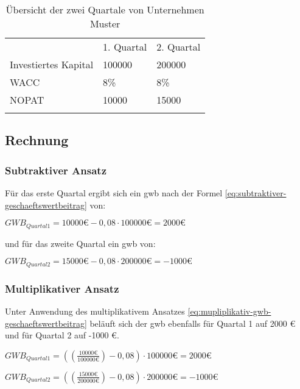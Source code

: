 \bigskip
\begin{table}[!h]
    \begin{tabular}{lll}
        \cline{1-3} \rowcolor{gray}
                             & 1. Quartal & 2. Quartal \\ \cline{1-3} \rowcolor{white}
        Investiertes Kapital & 100000     & 200000     \\ \cline{1-3} \rowcolor{white}
        WACC                 & 8\%        & 8\%        \\ \cline{1-3} \rowcolor{white}
        NOPAT                & 10000      & 15000      \\ \cline{1-3} \rowcolor{white}
    \end{tabular}
    \caption{Übersicht der zwei Quartale von Unternehmen Muster}
    \label{tb:evaQuartale}
\end{table}

\subsection{Rechnung}

\subsubsection{Subtraktiver Ansatz}

Für das erste Quartal ergibt sich ein \ac{gwb} nach der Formel \eqref{eq:subtraktiver-geschaeftswertbeitrag} von:

\bigskip
$GWB_{Quartal 1} = 10000 \text{€} - 0,08 \cdot 100000 \text{€} = 2000 \text{€}$

\bigskip
\noindent
und für das zweite Quartal ein \ac{gwb} von:

\bigskip
$GWB_{Quartal 2} = 15000 \text{€} - 0,08 \cdot 200000 \text{€} = -1000 \text{€}$

\subsubsection{Multiplikativer Ansatz}

Unter Anwendung des multiplikativem Ansatzes \eqref{eq:mupliplikativ-gwb-geschaeftswertbeitrag} beläuft sich der \ac{gwb} ebenfalls für Quartal 1 auf 2000 € und für Quartal 2 auf -1000 €.

\bigskip
$GWB_{Quartal 1} = ((\frac{10000 \text{€}}{100000 \text{€}}) - 0,08) \cdot 100000 \text{€} = 2000 \text{€}$

\bigskip
$GWB_{Quartal 2} = ((\frac{15000 \text{€}}{200000 \text{€}}) - 0,08) \cdot 200000 \text{€} = -1000 \text{€}$


